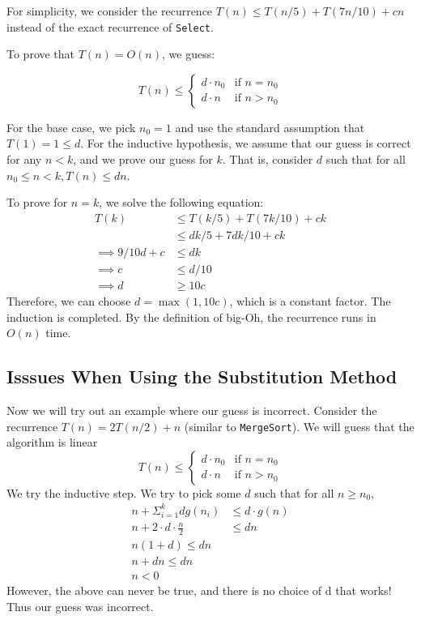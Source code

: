 \documentclass [12pt]{article}
\begin{document}
For simplicity, we consider the recurrence $T(n) \leq T(n/5) + T(7n/10) + cn $instead of the exact recurrence of \texttt{Select}.

To prove that $T(n) = O(n)$, we guess:

$$
T(n) \leq \begin{cases}
    d\cdot n_0 & \text{if } n = n_0 \\
    d \cdot n & \text{if } n > n_0
\end{cases}
$$

For the base case, we pick $n_0 = 1$ and use the standard assumption that $T(1) = 1 \leq d$. For the inductive hypothesis, we assume that our guess is correct for any $n < k$, and we prove our guess for $k$. That is, consider $d$ such that for all $n_0 \leq n < k, T(n) \leq dn$.

To prove for $n = k$, we solve the following equation:
\begin{align*}
T(k) &\leq T(k/5) + T(7k/10) + ck \\
&\leq  dk/5 + 7dk/10 + ck \\
\implies 9/10d + c &\leq dk \\
\implies c &\leq d/10 \\
\implies d &\geq 10c
\end{align*}
Therefore, we can choose $d = \max(1, 10c)$, which is a constant factor. The induction is completed. By the definition of big-Oh, the recurrence runs in $O(n)$ time.

\subsection{Isssues When Using the Substitution Method}

Now we will try out an example where our guess is incorrect. Consider the recurrence $T(n) = 2T(n/2) + n$ (similar to \texttt{MergeSort}). We will guess that the algorithm is linear
$$
T(n) \leq \begin{cases}
    d\cdot n_0 & \text{if } n = n_0 \\
    d \cdot n & \text{if } n > n_0
\end{cases}
$$
We try the inductive step. We try to pick some $d$ such that for all $n \geq n_0$,
\begin{align*}
n + \Sigma_{i=1}^{k} dg(n_i) &\leq d \cdot g(n) \\
n + 2\cdot d \cdot \frac{n}{2} &\leq dn \\
n(1 + d) \leq dn \\
n + dn \leq dn \\
n < 0
\end{align*}
However, the above can never be true, and there is no choice of d that works! Thus our guess was incorrect.
\end{document}
